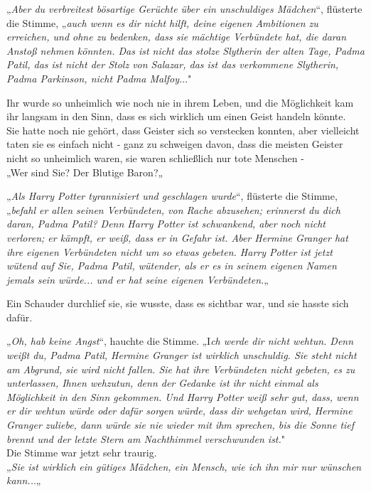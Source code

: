 {„\emph{Aber du verbreitest bösartige Gerüchte über ein unschuldiges Mädchen}“, flüsterte die Stimme, „\emph{auch wenn es dir nicht hilft, deine eigenen Ambitionen zu erreichen, und ohne zu bedenken, dass sie mächtige Verbündete hat, die daran Anstoß nehmen könnten. Das ist nicht das stolze Slytherin der alten Tage, Padma Patil, das ist nicht der Stolz von Salazar, das ist das verkommene Slytherin, Padma Parkinson, nicht Padma Malfoy.}.."

Ihr wurde so unheimlich wie noch nie in ihrem Leben, und die Möglichkeit kam ihr langsam in den Sinn, dass es sich wirklich um einen Geist handeln könnte.\\ Sie hatte noch nie gehört, dass Geister sich so verstecken konnten, aber vielleicht taten sie es einfach nicht - ganz zu schweigen davon, dass die meisten Geister nicht so unheimlich waren, sie waren schließlich nur tote Menschen -\\ „Wer sind Sie? Der Blutige Baron?„

„\emph{Als Harry Potter tyrannisiert und geschlagen wurde}“, flüsterte die Stimme,\\ „\emph{befahl er allen seinen Verbündeten, von Rache abzusehen; erinnerst du dich daran, Padma Patil? Denn Harry Potter ist schwankend, aber noch nicht verloren; er kämpft, er weiß, dass er in Gefahr ist. Aber Hermine Granger hat ihre eigenen Verbündeten nicht um so etwas gebeten. Harry Potter ist jetzt wütend auf Sie, Padma Patil, wütender, als er es in seinem eigenen Namen jemals sein würde... und er hat seine eigenen Verbündeten.}„

Ein Schauder durchlief sie, sie wusste, dass es sichtbar war, und sie hasste sich dafür.

„\emph{Oh, hab keine Angst}“, hauchte die Stimme. „I\emph{ch werde dir nicht wehtun. Denn weißt du, Padma Patil, Hermine Granger ist wirklich unschuldig. Sie steht nicht am Abgrund, sie wird nicht fallen. Sie hat ihre Verbündeten nicht gebeten, es zu unterlassen, Ihnen wehzutun, denn der Gedanke ist ihr nicht einmal als Möglichkeit in den Sinn gekommen. Und Harry Potter weiß sehr gut, dass, wenn er dir wehtun würde oder dafür sorgen würde, dass dir wehgetan wird, Hermine Granger zuliebe, dann würde sie nie wieder mit ihm sprechen, bis die Sonne tief brennt und der letzte Stern am Nachthimmel verschwunden ist.}"\\ Die Stimme war jetzt sehr traurig.\\ „\emph{Sie ist wirklich ein gütiges Mädchen, ein Mensch, wie ich ihn mir nur wünschen kann..}.„

}
